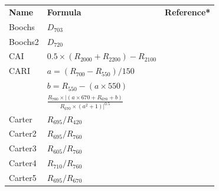 \documentclass[final]{IEEEtran}
\begin{document}
\section{}

\begingroup\scriptsize
\setlength\tabcolsep{4pt}  %
\begin{xtabular*}{0.3\textwidth}{lll}
	\bfseries{Name} & \bfseries{Formula}                                                                                  & \bfseries{Reference*}      \\
	Boochs          & $D_{703}$                                                                                           & \cite{boochs1990}       \\
	Boochs2         & $D_{720}$                                                                                           & \cite{boochs1990}       \\
	CAI             & $0.5 \times (R_{2000} + R_{2200}) -R_{2100}$                                                        & \cite{nagler2003}       \\
	\midrule
	CARI            & $a = (R_{700}-R_{550}) / 150$                                                                       & \cite{walthall1994}          \\
	& $b = R_{550}-(a\times 550)$                                                                                         &                                  \\
	& $\frac{R_{700}\times | (a\times 670+R_{670}+b)}{R_{670}\times(a^2+1)| ^{0.5}}$                                      &                                  \\
	\midrule
	Carter          & $R_{695}/R_{420}$                                                                                   & \cite{carter1994}              \\
	Carter2         & $R_{695}/R_{760}$                                                                                   & \cite{carter1994}              \\
	Carter3         & $R_{605}/R_{760}$                                                                                   & \cite{carter1994}              \\
	Carter4         & $R_{710}/R_{760}$                                                                                   & \cite{carter1994}              \\
	Carter5         & $R_{695}/R_{670}$                                                                                   & \cite{carter1994}              \\

\end{xtabular*}
\end{document}
